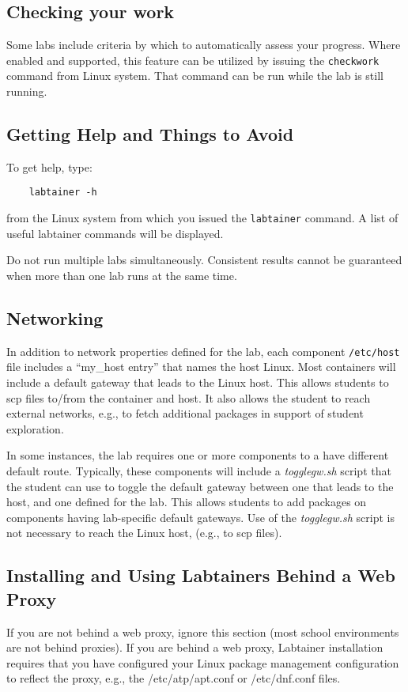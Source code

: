\documentclass[12pt]{article}
\begin{document}
\subsection{Checking your work}
Some labs include criteria by which to automatically assess your progress.
Where enabled and supported, this feature can be utilized by issuing the {\tt checkwork} command from Linux system.
That command can be run while the lab is still running.

\subsection{Getting Help and Things to Avoid}
To get help, type:
\begin{verbatim}
    labtainer -h
\end{verbatim}
\noindent from the Linux system from which you issued the {\tt labtainer} command. A list of useful labtainer commands will be displayed.

Do not run multiple labs simultaneously.  Consistent results cannot be guaranteed when more than one lab runs at the same time.

\subsection{Networking}
In addition to network properties defined for the lab,
each component \texttt{/etc/host} file includes a ``my\_host entry'' that names
the host Linux.  Most containers will include a default gateway that
leads to the Linux host.  This allows students to scp files to/from the container and host.
It also allows the student to reach external networks, e.g., to fetch additional packages in
support of student exploration.

In some instances, the lab requires one or more components to a have different default route.
Typically, these components will include a \textit{togglegw.sh} script that the student
can use to toggle the default gateway between one that leads to the host, and one defined for the lab.
This allows students to add packages on components having lab-specific default gateways.
Use of the \textit{togglegw.sh} script is not necessary to reach the Linux host, (e.g., to scp files).

\subsection{Installing and Using Labtainers Behind a Web Proxy}
If you are not behind a web proxy, ignore this section (most school environments
are not behind proxies). 
If you are behind a web proxy, Labtainer installation
requires that you have configured your Linux package management configuration to reflect
the proxy, e.g., the /etc/atp/apt.conf or /etc/dnf.conf files.  
\end{document}
